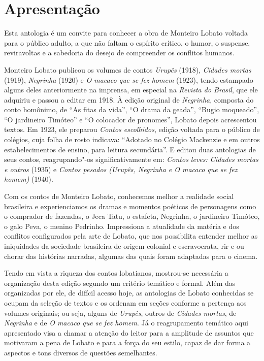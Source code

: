 \chapter{Apresentação}

Esta antologia é um convite para conhecer a obra de Monteiro Lobato
voltada para o público adulto, a que não faltam o espírito crítico, o
humor, o suspense, reviravoltas e a sabedoria do desejo de compreender
os conflitos humanos.

Monteiro Lobato publicou os volumes de contos \emph{Urupês} (1918),
\emph{Cidades mortas} (1919), \emph{Negrinha} (1920) e \emph{O macaco
que se fez homem} (1923), tendo estampado alguns deles anteriormente na
imprensa, em especial na \emph{Revista do Brasil}, que ele adquiriu e
passou a editar em 1918. À edição original de \emph{Negrinha}, composta
do conto homônimo, de ``As fitas da vida'', ``O drama da geada'',
``Bugio moqueado'', ``O jardineiro Timóteo'' e ``O colocador de
pronomes'', Lobato depois acrescentou textos. Em 1923, ele preparou
\emph{Contos escolhidos}, edição voltada para o público de colégios,
cuja folha de rosto indicava: ``Adotado no Colégio Mackenzie e em outros
estabelecimentos de ensino, para leitura secundária''. E editou duas
antologias de seus contos, reagrupando"-os significativamente em:
\emph{Contos leves: Cidades mortas e outros} (1935) e \emph{Contos
pesados (Urupês, Negrinha e O macaco que se fez homem)} (1940).

Com os contos de Monteiro Lobato, conhecemos melhor a realidade social
brasileira e experienciamos os dramas e momentos poéticos de personagens
como o comprador de fazendas, o Jeca Tatu, o estafeta, Negrinha, o
jardineiro Timóteo, o galo Peva, o menino Pedrinho. Impressiona a
atualidade da matéria e dos conflitos configurados pela arte de Lobato,
que nos possibilita entender melhor as iniquidades da sociedade
brasileira de origem colonial e escravocrata, rir e ou chorar das
histórias narradas, algumas das quais foram adaptadas para o cinema.

Tendo em vista a riqueza dos contos lobatianos, mostrou-se necessária a
organização desta edição segundo um critério temático e formal. Além das
organizadas por ele, de difícil acesso hoje, as antologias de Lobato
conhecidas se ocupam da seleção de textos e os ordenam em seções
conforme a pertença aos volumes originais; ou seja, alguns de
\emph{Urupês}, outros de \emph{Cidades mortas}, de \emph{Negrinha} e de
\emph{O macaco que se fez homem}. Já o reagrupamento temático aqui
apresentado visa a chamar a atenção do leitor para a amplitude de
assuntos que motivaram a pena de Lobato e para a força do seu estilo,
capaz de dar forma a aspectos e tons diversos de questões semelhantes.

